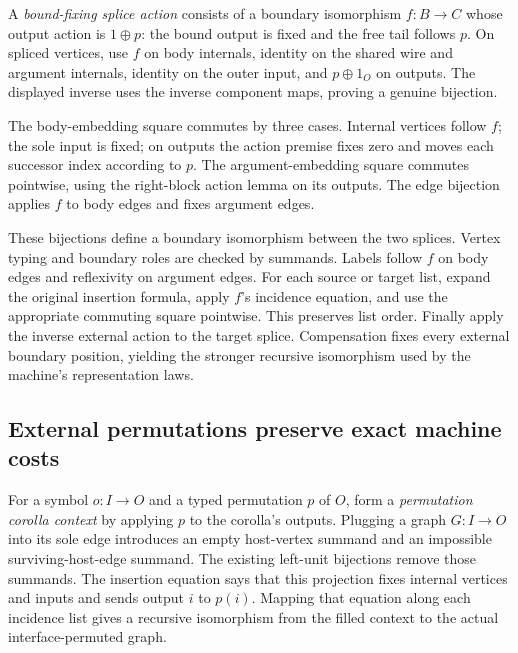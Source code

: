A \emph{bound-fixing splice action} consists of a boundary isomorphism
$f:B\to C$ whose output action is $1\oplus p$: the bound output is fixed and
the free tail follows $p$. On spliced vertices, use $f$ on body internals,
identity on the shared wire and argument internals, identity on the outer
input, and $p\oplus 1_O$ on outputs. The displayed inverse uses the inverse
component maps, proving a genuine bijection.

The body-embedding square commutes by three cases. Internal vertices follow
$f$; the sole input is fixed; on outputs the action premise fixes zero and
moves each successor index according to $p$. The argument-embedding square
commutes pointwise, using the right-block action lemma on its outputs.
The edge bijection applies $f$ to body edges and fixes argument edges.


These bijections define a boundary isomorphism between the two splices.
Vertex typing and boundary roles are checked by summands. Labels follow $f$
on body edges and reflexivity on argument edges. For each source or target
list, expand the original insertion formula, apply $f$'s incidence equation,
and use the appropriate commuting square pointwise. This preserves list order.
Finally apply the inverse external action to the target splice. Compensation
fixes every external boundary position, yielding the stronger recursive
isomorphism used by the machine's representation laws.


\subsection{External permutations preserve exact machine costs}
For a symbol $o:I\to O$ and a typed permutation $p$ of $O$, form a
\emph{permutation corolla context} by applying $p$ to the corolla's outputs.
Plugging a graph $G:I\to O$ into its sole edge introduces an empty host-vertex
summand and an impossible surviving-host-edge summand. The existing left-unit
bijections remove those summands. The insertion equation says that this
projection fixes internal vertices and inputs and sends output $i$ to $p(i)$.
Mapping that equation along each incidence list gives a recursive isomorphism
from the filled context to the actual interface-permuted graph.

